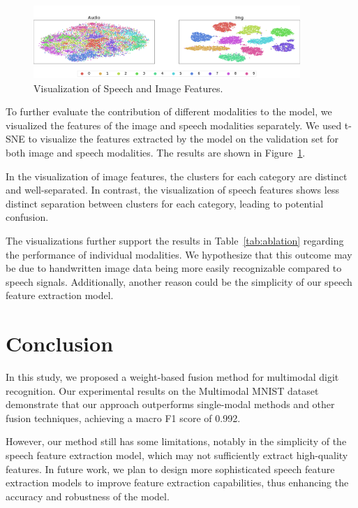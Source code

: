 \documentclass{article}
\begin{document}
\begin{figure}[!htb]
	\begin{center}
		
		\includegraphics[width=0.90\textwidth]{tsne.pdf}
	\end{center}
	\caption{Visualization of Speech and Image Features.} 
	\label{fig:visualization}
\end{figure}

To further evaluate the contribution of different modalities to the model, we visualized the features of the image and speech modalities separately. We used t-SNE to visualize the features extracted by the model on the validation set for both image and speech modalities. The results are shown in Figure~\ref{fig:visualization}.

In the visualization of image features, the clusters for each category are distinct and well-separated. In contrast, the visualization of speech features shows less distinct separation between clusters for each category, leading to potential confusion.

The visualizations further support the results in Table~\ref{tab:ablation} regarding the performance of individual modalities. We hypothesize that this outcome may be due to handwritten image data being more easily recognizable compared to speech signals. Additionally, another reason could be the simplicity of our speech feature extraction model.

\section{Conclusion}

In this study, we proposed a weight-based fusion method for multimodal digit recognition. Our experimental results on the Multimodal MNIST dataset demonstrate that our approach outperforms single-modal methods and other fusion techniques, achieving a macro F1 score of 0.992.

However, our method still has some limitations, notably in the simplicity of the speech feature extraction model, which may not sufficiently extract high-quality features. In future work, we plan to design more sophisticated speech feature extraction models to improve feature extraction capabilities, thus enhancing the accuracy and robustness of the model.
\end{document}
